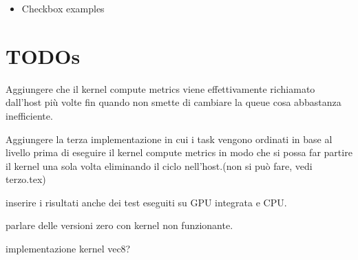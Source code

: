 \documentclass[../relazione.tex]{subfiles}
\begin{document}
\begin{itemize}
    \item Checkbox examples
\end{itemize}
\hline
\section{TODOs}
\begin{todolist}
    \item[\done] Aggiungere che il kernel compute metrics viene effettivamente richiamato dall'host più volte fin quando non smette di cambiare la queue cosa abbastanza inefficiente.
    \item[\wontfix] Aggiungere la terza implementazione in cui i task vengono ordinati in base al livello prima di eseguire il kernel compute metrics in modo che si possa far partire il kernel una sola volta eliminando il ciclo nell'host.(non si può fare, vedi terzo.tex)
    \item inserire i risultati anche dei test eseguiti su GPU integrata e CPU.
    \item parlare delle versioni zero con kernel non funzionante.
    \item implementazione kernel vec8?
\end{todolist}
\end{document}
